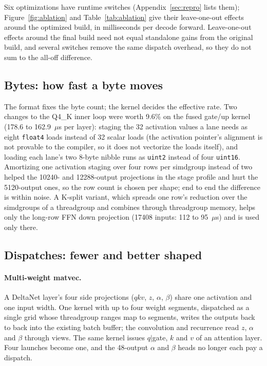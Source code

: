 \documentclass[11pt]{article}
\begin{document}
Six optimizations have runtime switches (Appendix~\ref{sec:repro} lists
them); Figure~\ref{fig:ablation} and Table~\ref{tab:ablation} give their
leave-one-out effects around the optimized build, in milliseconds per decode
forward. Leave-one-out effects around the final build need not equal
standalone gains from the original build, and several switches remove the
same dispatch overhead, so they do not sum to the all-off difference.

\subsection{Bytes: how fast a byte moves}
The format fixes the byte count; the kernel decides the effective rate. Two
changes to the Q4\_K inner loop were worth 9.6\% on the fused gate/up kernel
(178.6 to 162.9~$\mu$s per layer): staging the 32 activation values a lane
needs as eight \texttt{float4} loads instead of 32 scalar loads (the
activation pointer's alignment is not provable to the compiler, so it does not
vectorize the loads itself), and loading each lane's two 8-byte nibble runs as
\texttt{uint2} instead of four \texttt{uint16}. Amortizing one activation
staging over four rows per simdgroup instead of two helped the 10240- and
12288-output projections in the stage profile and hurt the 5120-output ones,
so the row count is chosen per shape; end to end the difference is within
noise. A K-split variant, which spreads one row's reduction over the
simdgroups of a threadgroup and combines through threadgroup memory, helps
only the long-row FFN down projection (17408 inputs: 112 to 95~$\mu$s) and is
used only there.

\subsection{Dispatches: fewer and better shaped}
\paragraph{Multi-weight matvec.} A DeltaNet layer's four side projections
($qkv$, $z$, $\alpha$, $\beta$) share one activation and one input width. One
kernel with up to four weight segments, dispatched as a single grid whose
threadgroup ranges map to segments, writes the outputs back to back into the
existing batch buffer; the convolution and recurrence read $z$, $\alpha$ and
$\beta$ through views. The same kernel issues $q|$gate, $k$ and $v$ of an
attention layer. Four launches become one, and the 48-output $\alpha$ and
$\beta$ heads no longer each pay a dispatch.
\end{document}

